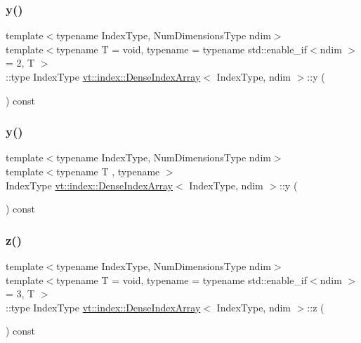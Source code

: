 \subsubsection{\texorpdfstring{y()}{y()}\hspace{0.1cm}{\footnotesize\ttfamily [1/2]}}
{\footnotesize\ttfamily template$<$typename Index\+Type, Num\+Dimensions\+Type ndim$>$ \\
template$<$typename T  = void, typename  = typename std\+::enable\+\_\+if$<$ndim $>$= 2, T $>$ \\
\+::type Index\+Type \hyperlink{structvt_1_1index_1_1_dense_index_array}{vt\+::index\+::\+Dense\+Index\+Array}$<$ Index\+Type, ndim $>$\+::y (\begin{DoxyParamCaption}{ }\end{DoxyParamCaption}) const}

\mbox{\label{structvt_1_1index_1_1_dense_index_array_a23d6673153f284a46bad6e1be6781e08}} 
\subsubsection{\texorpdfstring{y()}{y()}\hspace{0.1cm}{\footnotesize\ttfamily [2/2]}}
{\footnotesize\ttfamily template$<$typename Index\+Type, Num\+Dimensions\+Type ndim$>$ \\
template$<$typename T , typename $>$ \\
Index\+Type \hyperlink{structvt_1_1index_1_1_dense_index_array}{vt\+::index\+::\+Dense\+Index\+Array}$<$ Index\+Type, ndim $>$\+::y (\begin{DoxyParamCaption}{ }\end{DoxyParamCaption}) const}

\mbox{\label{structvt_1_1index_1_1_dense_index_array_a8de61716f67863e9c1eca84f8c99de22}} 
\subsubsection{\texorpdfstring{z()}{z()}\hspace{0.1cm}{\footnotesize\ttfamily [1/2]}}
{\footnotesize\ttfamily template$<$typename Index\+Type, Num\+Dimensions\+Type ndim$>$ \\
template$<$typename T  = void, typename  = typename std\+::enable\+\_\+if$<$ndim $>$= 3, T $>$ \\
\+::type Index\+Type \hyperlink{structvt_1_1index_1_1_dense_index_array}{vt\+::index\+::\+Dense\+Index\+Array}$<$ Index\+Type, ndim $>$\+::z (\begin{DoxyParamCaption}{ }\end{DoxyParamCaption}) const}


